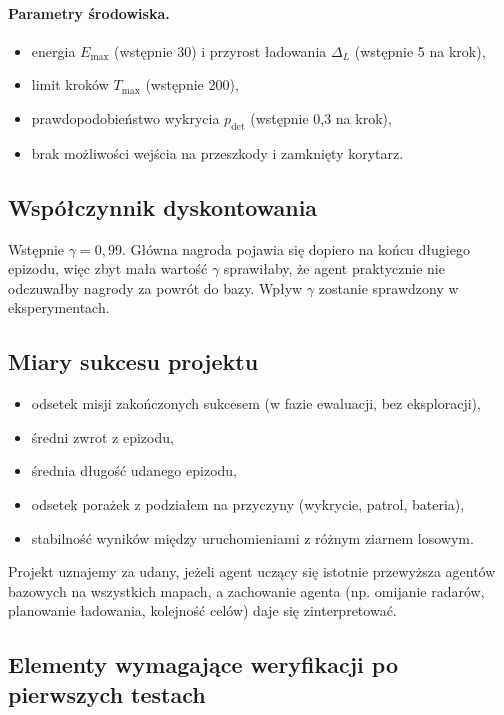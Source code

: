 \paragraph{Parametry środowiska.}
\begin{itemize}
  \item energia $E_{\max}$ (wstępnie 30) i przyrost ładowania $\Delta_L$
        (wstępnie 5 na krok),
  \item limit kroków $T_{\max}$ (wstępnie 200),
  \item prawdopodobieństwo wykrycia $p_{\text{det}}$ (wstępnie 0{,}3 na krok),
  \item brak możliwości wejścia na przeszkody i zamknięty korytarz.
\end{itemize}

\subsection{Współczynnik dyskontowania}

Wstępnie $\gamma = 0{,}99$. Główna nagroda pojawia się dopiero na końcu
długiego epizodu, więc zbyt mała wartość $\gamma$ sprawiłaby, że agent
praktycznie nie odczuwałby nagrody za powrót do bazy. Wpływ $\gamma$ zostanie
sprawdzony w eksperymentach.

\subsection{Miary sukcesu projektu}
\label{sec:miary}

\begin{itemize}
  \item odsetek misji zakończonych sukcesem (w fazie ewaluacji, bez eksploracji),
  \item średni zwrot z epizodu,
  \item średnia długość udanego epizodu,
  \item odsetek porażek z podziałem na przyczyny (wykrycie, patrol, bateria),
  \item stabilność wyników między uruchomieniami z różnym ziarnem losowym.
\end{itemize}

Projekt uznajemy za udany, jeżeli agent uczący się istotnie przewyższa agentów
bazowych na wszystkich mapach, a zachowanie agenta (np. omijanie radarów,
planowanie ładowania, kolejność celów) daje się zinterpretować.

\subsection{Elementy wymagające weryfikacji po pierwszych testach}
\label{sec:otwarte}

